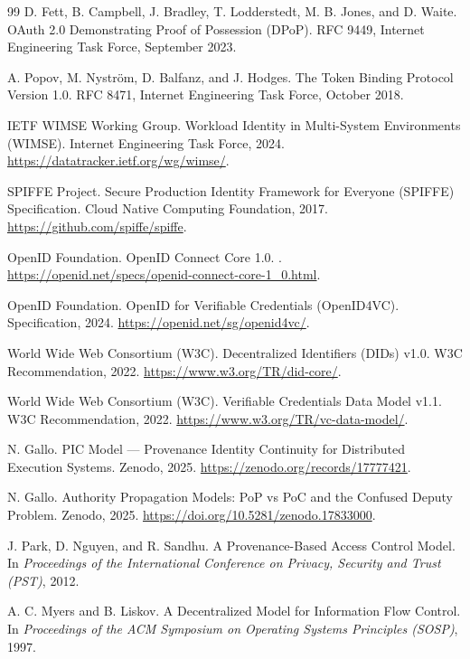 \documentclass[11pt]{article}
\begin{document}
\begin{thebibliography}{99}
D. Fett, B. Campbell, J. Bradley, T. Lodderstedt, M. B. Jones, and D. Waite.
\newblock OAuth 2.0 Demonstrating Proof of Possession (DPoP).
\newblock RFC 9449, Internet Engineering Task Force, September 2023.

A. Popov, M. Nystr\"om, D. Balfanz, and J. Hodges.
\newblock The Token Binding Protocol Version 1.0.
\newblock RFC 8471, Internet Engineering Task Force, October 2018.

IETF WIMSE Working Group.
\newblock Workload Identity in Multi-System Environments (WIMSE).
\newblock Internet Engineering Task Force, 2024.
\url{https://datatracker.ietf.org/wg/wimse/}.

SPIFFE Project.
\newblock Secure Production Identity Framework for Everyone (SPIFFE)
Specification.
\newblock Cloud Native Computing Foundation, 2017.
\url{https://github.com/spiffe/spiffe}.

OpenID Foundation.
\newblock OpenID Connect Core 1.0.
. \url{https://openid.net/specs/openid-connect-core-1_0.html}.

OpenID Foundation.
\newblock OpenID for Verifiable Credentials (OpenID4VC).
\newblock Specification, 2024. \url{https://openid.net/sg/openid4vc/}.

World Wide Web Consortium (W3C).
\newblock Decentralized Identifiers (DIDs) v1.0.
\newblock W3C Recommendation, 2022. \url{https://www.w3.org/TR/did-core/}.

World Wide Web Consortium (W3C).
\newblock Verifiable Credentials Data Model v1.1.
\newblock W3C Recommendation, 2022. \url{https://www.w3.org/TR/vc-data-model/}.

N. Gallo.
\newblock PIC Model --- Provenance Identity Continuity for Distributed Execution
Systems.
\newblock Zenodo, 2025. \url{https://zenodo.org/records/17777421}.

N. Gallo.
\newblock Authority Propagation Models: PoP vs PoC and the Confused Deputy
Problem.
\newblock Zenodo, 2025. \url{https://doi.org/10.5281/zenodo.17833000}.

J. Park, D. Nguyen, and R. Sandhu.
\newblock A Provenance-Based Access Control Model.
\newblock In \emph{Proceedings of the International Conference on Privacy,
Security and Trust (PST)}, 2012.

A. C. Myers and B. Liskov.
\newblock A Decentralized Model for Information Flow Control.
\newblock In \emph{Proceedings of the ACM Symposium on Operating Systems
Principles (SOSP)}, 1997.

\end{thebibliography}
\end{document}
